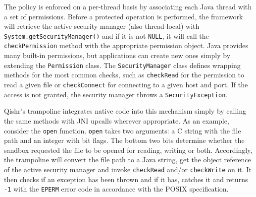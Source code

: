 \documentclass[a4paper,12pt,twoside,openright]{report}
\newcommand{\class}[1]{\texttt{#1}}
\begin{document}
The policy is enforced on a per-thread basis by associating each Java thread with a set of permissions. Before a protected operation is performed, the framework will retrieve the active security manager (also thread-local) with \texttt{System.{\allowbreak}getSecurityManager()} and if it is not \texttt{NULL}, it will call the \texttt{checkPermission} method with the appropriate permission object. Java provides many built-in permissions, but applications can create new ones simply by extending the \class{Permission} class. The \class{Security\-Manager} class defines wrapping methods for the most common checks, such as \texttt{checkRead} for the permission to read a given file or \texttt{checkConnect} for connecting to a given host and port. If the access is not granted, the security manager throws a \texttt{SecurityException}.

Qishr's trampoline integrates native code into this mechanism simply by calling the same methods with JNI upcalls wherever appropriate. As an example, consider the \texttt{open} function. \texttt{open} takes two arguments: a C string with the file path and an integer with bit flags. The bottom two bits determine whether the sandbox requested the file to be opened for reading, writing or both. Accordingly, the trampoline will convert the file path to a Java string, get the object reference of the active security manager and invoke \texttt{checkRead} and/or \texttt{checkWrite} on it. It then checks if an exception has been thrown and if it has, catches it and returns \texttt{-1} with the \texttt{EPERM} error code in accordance with the POSIX specification. \label{sec:SyscallException}
\end{document}
